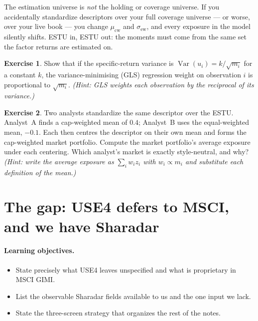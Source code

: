 \documentclass[11pt]{article}
\theoremstyle{definition}
\newtheorem{exercise}{Exercise}[section]
\theoremstyle{plain}
\theoremstyle{remark}
\DeclareMathOperator{\Var}{Var}
\begin{document}
\begin{pitfall}
The estimation universe is \emph{not} the holding or coverage universe. If you accidentally standardize descriptors over your full coverage universe --- or worse, over your live book --- you change $\mu_{\text{cw}}$ and $\sigma_{\text{ew}}$, and every exposure in the model silently shifts. ESTU in, ESTU out: the moments must come from the same set the factor returns are estimated on.
\end{pitfall}

\begin{exercise}
Show that if the specific-return variance is $\Var(u_i)=k/\sqrt{m_i}$ for a constant $k$, the variance-minimising (GLS) regression weight on observation $i$ is proportional to $\sqrt{m_i}$. \emph{(Hint: GLS weights each observation by the reciprocal of its variance.)}
\end{exercise}

\begin{exercise}
Two analysts standardize the same descriptor over the ESTU. Analyst~A finds a cap-weighted mean of $0.4$; Analyst~B uses the equal-weighted mean, $-0.1$. Each then centres the descriptor on their own mean and forms the cap-weighted market portfolio. Compute the market portfolio's average exposure under each centering. Which analyst's market is exactly style-neutral, and why? \emph{(Hint: write the average exposure as $\sum_i w_i z_i$ with $w_i\propto m_i$ and substitute each definition of the mean.)}
\end{exercise}

\section{The gap: USE4 defers to MSCI, and we have Sharadar}\label{sec:gap}

\paragraph{Learning objectives.}
\begin{itemize}[nosep,leftmargin=1.4em]
  \item State precisely what USE4 leaves unspecified and what is proprietary in MSCI GIMI.
  \item List the observable Sharadar fields available to us and the one input we lack.
  \item State the three-screen strategy that organizes the rest of the notes.
\end{itemize}
\end{document}
